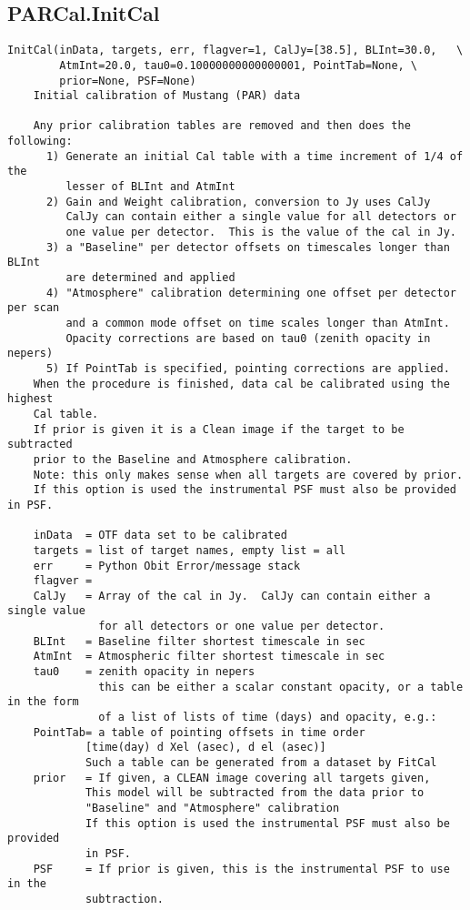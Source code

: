 \documentclass[11pt]{report}
\begin{document}
\subsection{PARCal.InitCal}
\begin{verbatim}
InitCal(inData, targets, err, flagver=1, CalJy=[38.5], BLInt=30.0,   \
        AtmInt=20.0, tau0=0.10000000000000001, PointTab=None, \
        prior=None, PSF=None)
    Initial calibration of Mustang (PAR) data
    
    Any prior calibration tables are removed and then does the following:
      1) Generate an initial Cal table with a time increment of 1/4 of the
         lesser of BLInt and AtmInt
      2) Gain and Weight calibration, conversion to Jy uses CalJy
         CalJy can contain either a single value for all detectors or
         one value per detector.  This is the value of the cal in Jy.
      3) a "Baseline" per detector offsets on timescales longer than BLInt
         are determined and applied
      4) "Atmosphere" calibration determining one offset per detector per scan
         and a common mode offset on time scales longer than AtmInt.
         Opacity corrections are based on tau0 (zenith opacity in nepers)
      5) If PointTab is specified, pointing corrections are applied.
    When the procedure is finished, data cal be calibrated using the highest
    Cal table.
    If prior is given it is a Clean image if the target to be subtracted
    prior to the Baseline and Atmosphere calibration.
    Note: this only makes sense when all targets are covered by prior.
    If this option is used the instrumental PSF must also be provided in PSF.
    
    inData  = OTF data set to be calibrated
    targets = list of target names, empty list = all
    err     = Python Obit Error/message stack
    flagver =
    CalJy   = Array of the cal in Jy.  CalJy can contain either a single value
              for all detectors or one value per detector.  
    BLInt   = Baseline filter shortest timescale in sec
    AtmInt  = Atmospheric filter shortest timescale in sec
    tau0    = zenith opacity in nepers
              this can be either a scalar constant opacity, or a table in the form
              of a list of lists of time (days) and opacity, e.g.:
    PointTab= a table of pointing offsets in time order
            [time(day) d Xel (asec), d el (asec)]
            Such a table can be generated from a dataset by FitCal
    prior   = If given, a CLEAN image covering all targets given,
            This model will be subtracted from the data prior to
            "Baseline" and "Atmosphere" calibration
            If this option is used the instrumental PSF must also be provided
            in PSF.
    PSF     = If prior is given, this is the instrumental PSF to use in the
            subtraction.
\end{verbatim}
\end{document}

